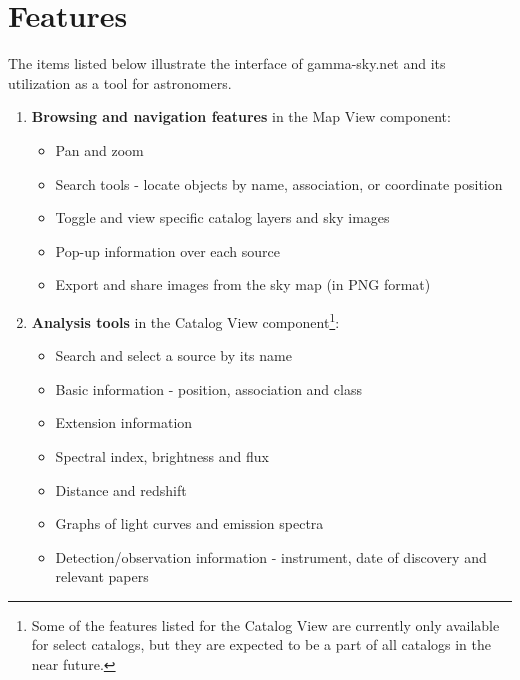 \renewcommand{\thefootnote}{\fnsymbol{footnote}}

\section{Features}

The items listed below illustrate the interface of gamma-sky.net and its utilization as a tool for astronomers.

\begin{enumerate}

\item \textbf{Browsing and navigation features} in the Map View component:

\begin{itemize}
\item Pan and zoom
\item Search tools - locate objects by name, association, or coordinate position
\item Toggle and view specific catalog layers and sky images
\item Pop-up information over each source
\item Export and share images from the sky map (in PNG format)
\end{itemize}

\item \textbf{Analysis tools} in the Catalog View component\footnote[1]{Some of the features listed for the Catalog View are currently only available for select catalogs, but they are expected to be a part of all catalogs in the near future.}:

\begin{itemize}

\item Search and select a source by its name
\item Basic information - position, association and class
\item Extension information
\item Spectral index, brightness and flux
\item Distance and redshift
\item Graphs of light curves and emission spectra
\item Detection/observation information - instrument, date of discovery and relevant papers

\end{itemize}

\end{enumerate}
